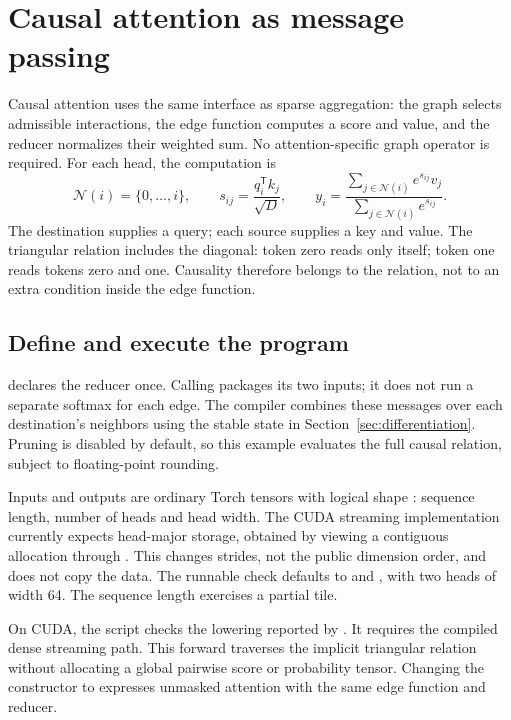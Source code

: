 \section{Causal attention as message passing}
\label{app:attention}
Causal attention uses the same interface as sparse aggregation: the graph
selects admissible interactions, the edge function computes a score and value,
and the reducer normalizes their weighted sum. No attention-specific graph
operator is required. For each head, the computation is
$$
\mathcal{N}(i)=\{0,\ldots,i\},\qquad
s_{ij}=\frac{q_i^{\mathsf{T}}k_j}{\sqrt{D}},\qquad
y_i=\frac{\sum_{j\in\mathcal{N}(i)}e^{s_{ij}}v_j}
               {\sum_{j\in\mathcal{N}(i)}e^{s_{ij}}}.
$$
The destination supplies a query; each source supplies a key and value.
The triangular relation includes the diagonal: token zero reads only
itself; token one reads tokens zero and one. Causality therefore belongs to
the relation, not to an extra condition inside the edge function.

\subsection{Define and execute the program}
 declares the reducer once. Calling
 packages its two inputs; it does not run a
separate softmax for each edge. The compiler combines these messages over each
destination's neighbors using the stable state in
Section~\ref{sec:differentiation}. Pruning is disabled by default, so this
example evaluates the full causal relation, subject to floating-point rounding.


Inputs and outputs are ordinary Torch tensors with logical shape
: sequence length, number of heads and head width. The CUDA
streaming implementation currently expects head-major storage, obtained by
viewing a contiguous  allocation through .
This changes strides, not the public dimension order, and does not copy the data.
The runnable check defaults to  and , with
two heads of width 64. The sequence length exercises a partial tile.


On CUDA, the script checks the lowering reported by .
It requires the compiled dense streaming path. This forward
traverses the implicit triangular relation without allocating a global
pairwise score or probability tensor. Changing the constructor to
 expresses unmasked attention with the same edge
function and reducer.

